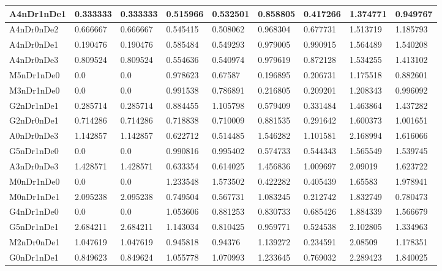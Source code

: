 \documentclass[../thesis.tex]{subfiles}
\begin{document}
\begin{table}[!ht]
\begin{tabular}{|l|l|l|l|l|l|l|l|l|}
        A4nDr1nDe1 & 0.333333 & 0.333333 & 0.515966 & 0.532501 & 0.858805 & 0.417266 & 1.374771 & 0.949767 \\ \hline
        A4nDr0nDe2 & 0.666667 & 0.666667 & 0.545415 & 0.508062 & 0.968304 & 0.677731 & 1.513719 & 1.185793 \\ \hline
        A4nDr0nDe1 & 0.190476 & 0.190476 & 0.585484 & 0.549293 & 0.979005 & 0.990915 & 1.564489 & 1.540208 \\ \hline
        A4nDr0nDe3 & 0.809524 & 0.809524 & 0.554636 & 0.540974 & 0.979619 & 0.872128 & 1.534255 & 1.413102 \\ \hline
        M5nDr1nDe0 & 0.0 & 0.0 & 0.978623 & 0.67587 & 0.196895 & 0.206731 & 1.175518 & 0.882601 \\ \hline
        M3nDr1nDe0 & 0.0 & 0.0 & 0.991538 & 0.786891 & 0.216805 & 0.209201 & 1.208343 & 0.996092 \\ \hline
        G2nDr1nDe1 & 0.285714 & 0.285714 & 0.884455 & 1.105798 & 0.579409 & 0.331484 & 1.463864 & 1.437282 \\ \hline
        G2nDr0nDe1 & 0.714286 & 0.714286 & 0.718838 & 0.710009 & 0.881535 & 0.291642 & 1.600373 & 1.001651 \\ \hline
        A0nDr0nDe3 & 1.142857 & 1.142857 & 0.622712 & 0.514485 & 1.546282 & 1.101581 & 2.168994 & 1.616066 \\ \hline
        G5nDr1nDe0 & 0.0 & 0.0 & 0.990816 & 0.995402 & 0.574733 & 0.544343 & 1.565549 & 1.539745 \\ \hline
        A3nDr0nDe3 & 1.428571 & 1.428571 & 0.633354 & 0.614025 & 1.456836 & 1.009697 & 2.09019 & 1.623722 \\ \hline
        M0nDr1nDe0 & 0.0 & 0.0 & 1.233548 & 1.573502 & 0.422282 & 0.405439 & 1.65583 & 1.978941 \\ \hline
        M0nDr1nDe1 & 2.095238 & 2.095238 & 0.749504 & 0.567731 & 1.083245 & 0.212742 & 1.832749 & 0.780473 \\ \hline
        G4nDr1nDe0 & 0.0 & 0.0 & 1.053606 & 0.881253 & 0.830733 & 0.685426 & 1.884339 & 1.566679 \\ \hline
        G5nDr1nDe1 & 2.684211 & 2.684211 & 1.143034 & 0.810425 & 0.959771 & 0.524538 & 2.102805 & 1.334963 \\ \hline
        M2nDr0nDe1 & 1.047619 & 1.047619 & 0.945818 & 0.94376 & 1.139272 & 0.234591 & 2.08509 & 1.178351 \\ \hline
        G0nDr1nDe1 & 0.849623 & 0.849624 & 1.055778 & 1.070993 & 1.233645 & 0.769032 & 2.289423 & 1.840025 \\ \hline

\end{tabular}
\end{table}
\end{document}
